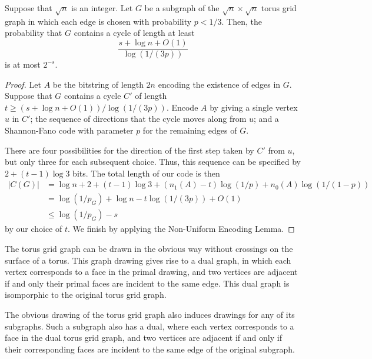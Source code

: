 \documentclass{patmorin}
\begin{document}
\begin{thm}
  Suppose that $\sqrt{n}$ is an integer.  Let $G$ be a subgraph of the
  $\sqrt{n} \times \sqrt{n}$ torus grid graph in which each edge is
  chosen with probability $p < 1/3$. Then, the probability that $G$
  contains a cycle of length at least
  \[
    \frac{s + \log n + O(1)}{\log (1/(3p))}
  \]
  is at most $2^{-s}$.
\end{thm}
\begin{proof}
  Let $A$ be the bitstring of length $2n$ encoding the existence of
  edges in $G$. Suppose that $G$ contains a cycle $C'$ of length
  $t \geq (s + \log n + O(1))/\log (1/(3p))$. Encode $A$ by giving a
  single vertex $u$ in $C'$; the sequence of directions that the cycle
  moves along from $u$; and a Shannon-Fano code with parameter $p$ for
  the remaining edges of $G$.

  There are four possibilities for the direction of the
  first step taken by $C'$ from $u$, but only three for each
  subsequent choice. Thus, this sequence can be specified by
  $2 + (t - 1) \log 3$ bits. The total length of our code is then
  \begin{align*}
    |C(G)| &= \log n + 2 + (t - 1) \log 3 + (n_1(A) - t) \log (1/p) +
             n_0(A) \log (1/(1 - p)) \\
           &= \log (1/p_G) + \log n - t \log (1/(3p)) + O(1) \\
           &\leq \log (1/p_G) - s
  \end{align*}
  by our choice of $t$. We finish by applying the Non-Uniform Encoding
  Lemma.
\end{proof}

The torus grid graph can be drawn in the obvious way without crossings
on the surface of a torus. This graph drawing gives rise to a dual
graph, in which each vertex corresponds to a face in the primal
drawing, and two vertices are adjacent if and only their primal faces
are incident to the same edge. This dual graph is isomporphic to the
original torus grid graph.

The obvious drawing of the torus grid graph also induces drawings for
any of its subgraphs. Such a subgraph also has a dual, where each
vertex corresponds to a face in the dual torus grid graph, and two
vertices are adjacent if and only if their corresponding faces are
incident to the same edge of the original subgraph.
\end{document}
